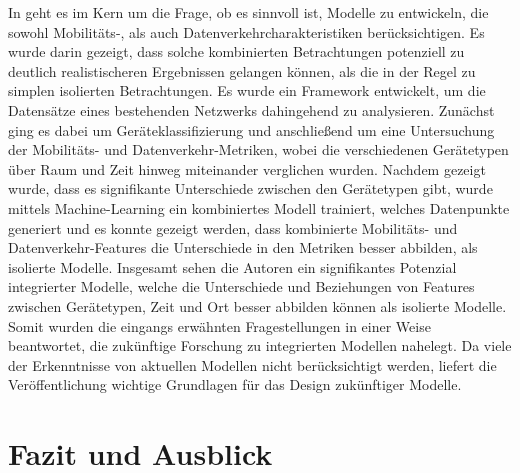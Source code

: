 \documentclass[12pt, a4paper]{article}
\begin{document}
In \cite{Alipour2018} geht es im Kern um die Frage, ob es sinnvoll ist, Modelle zu entwickeln, die sowohl
Mobilitäts-, als auch Datenverkehrcharakteristiken berücksichtigen. Es wurde darin gezeigt, dass solche
kombinierten Betrachtungen potenziell zu deutlich realistischeren Ergebnissen gelangen können,
als die in der Regel zu simplen isolierten Betrachtungen.
Es wurde ein Framework entwickelt, um die Datensätze eines bestehenden Netzwerks dahingehend zu analysieren.
Zunächst ging es dabei um Geräteklassifizierung und anschließend um eine Untersuchung der Mobilitäts-
und Datenverkehr-Metriken, wobei die verschiedenen Gerätetypen über Raum und Zeit hinweg miteinander verglichen wurden.
Nachdem gezeigt wurde, dass es signifikante Unterschiede zwischen den Gerätetypen gibt,
wurde mittels Machine-Learning ein kombiniertes Modell trainiert, welches Datenpunkte generiert
und es konnte gezeigt werden, dass kombinierte Mobilitäts- und Datenverkehr-Features die Unterschiede in den
Metriken besser abbilden, als isolierte Modelle. Insgesamt sehen die Autoren ein signifikantes Potenzial integrierter 
Modelle, welche die Unterschiede und Beziehungen von Features zwischen Gerätetypen, Zeit und
Ort besser abbilden können als isolierte Modelle. Somit wurden die eingangs erwähnten Fragestellungen in einer Weise
beantwortet, die zukünftige Forschung zu integrierten Modellen nahelegt. Da viele der Erkenntnisse von aktuellen 
Modellen nicht berücksichtigt werden, liefert die Veröffentlichung wichtige Grundlagen für das Design zukünftiger Modelle.

\section{Fazit und Ausblick}
\label{sec:conclusion}
\end{document}
